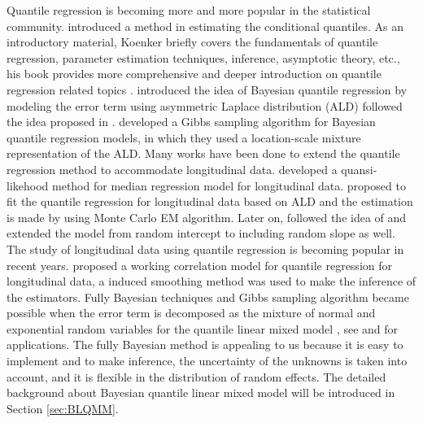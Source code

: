 \documentclass{article}
\begin{document}
Quantile regression is becoming more and more popular in the statistical community. \cite{koenker1978regression} introduced a method in estimating the conditional quantiles. As an introductory material, Koenker \cite{koenker2001quantile} briefly covers the fundamentals of quantile regression, parameter estimation techniques, inference, asymptotic theory, etc., his book provides more comprehensive and deeper introduction on quantile regression related topics \cite{koenker2005quantile}.  \cite{yu2001bayesian} introduced the idea of Bayesian quantile regression by modeling the error term using asymmetric Laplace distribution (ALD) followed the idea proposed in \cite{koenker1978regression}. \cite{kozumi2011gibbs} developed a Gibbs sampling algorithm for Bayesian quantile regression models, in which they used a location-scale mixture representation of the ALD. Many works have been done to extend the quantile regression method to accommodate longitudinal data. \cite{jung1996quasi} developed a quansi-likehood method for median regression model for longitudinal data. \cite{geraci2007quantile} proposed to fit the quantile regression for longitudinal data based on ALD and the estimation is made by using Monte Carlo EM algorithm. Later on, \cite{liu2009mixed} followed the idea of \cite{geraci2007quantile} and extended the model from random intercept to including random slope as well. The study of longitudinal data using quantile regression is becoming popular in recent years. \cite{fu2012quantile} proposed  a working correlation model for quantile regression for longitudinal data, a induced smoothing method was used to make the inference of the estimators. Fully Bayesian techniques and  Gibbs sampling algorithm became possible when the error term is decomposed as the mixture of normal and exponential random variables for the quantile linear mixed model  \citep{kotz2001laplace}, see \cite{kozumi2011gibbs} and \cite{luo2012bayesian} for applications. The fully Bayesian method is appealing to us because it is easy to implement and to make inference, the uncertainty of the unknowns is taken into account, and it is flexible in the distribution of random effects. The detailed background about Bayesian quantile linear mixed model will be introduced in Section \ref{sec:BLQMM}.\par
\end{document}
